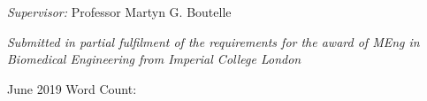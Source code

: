 \begin{titlepage}
\begin{center}
\large
\textit{Supervisor:}
Professor Martyn G. Boutelle


\vspace{5cm}
\small
\textit{Submitted in partial fulfilment of the requirements for the award of MEng in Biomedical Engineering from Imperial College London}

\end{center}

\vspace{2.5cm}
June 2019   \hfill  Word Count:

\vfill %



\makeatother


\end{titlepage}
